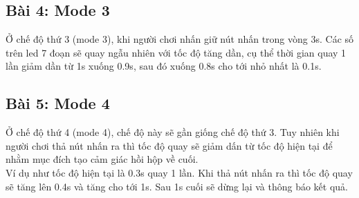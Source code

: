 \subsection{Bài 4: Mode 3}
Ở chế độ thứ 3 (mode 3), khi người chơi nhấn giữ nút nhấn trong vòng 3s.
Các số trên led 7 đoạn sẽ quay ngẫu nhiên với tốc độ tăng dần, cụ thể thời gian quay 1 lần giảm dần từ 1s xuống 0.9s, sau đó xuống 0.8s cho tới nhỏ nhất là 0.1s.
\subsection{Bài 5: Mode 4}
Ở chế độ thứ 4 (mode 4), chế độ này sẽ gần giống chế độ thứ 3. 
Tuy nhiên khi người chơi thả nút nhấn ra thì tốc độ quay sẽ giảm dấn từ tốc độ hiện tại để nhằm mục đích tạo cảm giác hồi hộp về cuối.
\\Ví dụ như tốc độ hiện tại là 0.3s quay 1 lần. Khi thả nút nhấn ra thì tốc độ quay sẽ tăng lên 0.4s và tăng cho tới 1s.
Sau 1s cuối sẽ dừng lại và thông báo kết quả.